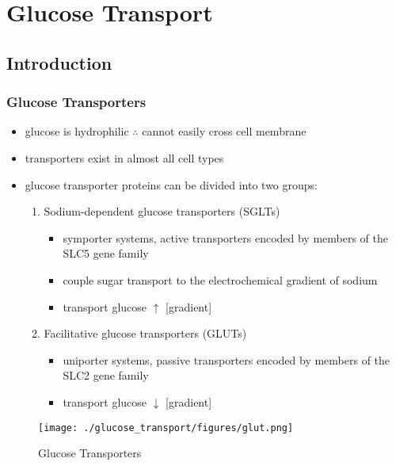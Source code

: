 \documentclass{scrartcl}
\begin{document}
\section{Glucose Transport}
\label{sec:orgfb3c2df}
\subsection{Introduction}
\label{sec:org62c9db0}
\subsubsection{Glucose Transporters}
\label{sec:org9a6ea3e}
\begin{itemize}
\item glucose is hydrophilic \(\therefore\) cannot easily cross cell membrane
\item transporters exist in almost all cell types
\item glucose transporter proteins can be divided into two groups:
\begin{enumerate}
\item Sodium-dependent glucose transporters (SGLTs)
\begin{itemize}
\item symporter systems, active transporters encoded by members of
the SLC5 gene family
\item couple sugar transport to the electrochemical gradient of sodium
\item transport glucose \(\uparrow\) [gradient]
\end{itemize}
\item Facilitative glucose transporters (GLUTs)
\begin{itemize}
\item uniporter systems, passive transporters encoded by members of the SLC2 gene family
\item transport glucose \(\downarrow\) [gradient]
\end{itemize}
\end{enumerate}
\end{itemize}

\begin{figure}[htbp]
\centering
\texttt{[image: ./glucose\_transport/figures/glut.png]}
\caption[glucose transporters]{\label{fig:org95a282e}
Glucose Transporters}
\end{figure}
\end{document}
